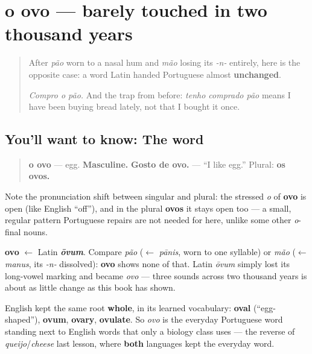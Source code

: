 \section[o ovo]{o ovo — barely touched in two thousand years}

\label{lesson:PT-C24-ovo}



\begin{quote}
After \emph{pão} worn to a nasal hum and \emph{mão} losing its \emph{-n-} entirely, here is the opposite case: a word Latin handed Portuguese almost \textbf{unchanged}.

\emph{Compro o pão.} And the trap from before: \emph{tenho comprado pão} means I have been buying bread lately, not that I bought it once.
\end{quote}

\subsection*{You'll want to know: The word}
\begin{quote}
\textbf{o ovo} — egg. \textbf{Masculine.} \textbf{Gosto de ovo.} — \textquotedblleft{}I like egg.\textquotedblright{} Plural: \textbf{os ovos.}
\end{quote}

Note the pronunciation shift between singular and plural: the stressed \emph{o} of \textbf{ovo} is open (like English \textquotedblleft{}off\textquotedblright{}), and in the plural \textbf{ovos} it stays open too — a small, regular pattern Portuguese repairs are not needed for here, unlike some other \emph{o}-final nouns.

\begin{cousinweb}
\textbf{ovo} $\leftarrow$ Latin \emph{\textbf{ōvum}}. Compare \emph{pão} ($\leftarrow$ \emph{pānis}, worn to one syllable) or \emph{mão} ($\leftarrow$ \emph{manus}, its \emph{-n-} dissolved): \textbf{ovo} shows none of that. Latin \emph{ōvum} simply lost its long-vowel marking and became \emph{ovo} — three sounds across two thousand years is about as little change as this book has shown.

English kept the same root \textbf{whole}, in its learned vocabulary: \textbf{oval} (\textquotedblleft{}egg-shaped\textquotedblright{}), \textbf{ovum}, \textbf{ovary}, \textbf{ovulate}. So \emph{ovo} is the everyday Portuguese word standing next to English words that only a biology class uses — the reverse of \emph{queijo}/\emph{cheese} last lesson, where \textbf{both} languages kept the everyday word.
\end{cousinweb}

